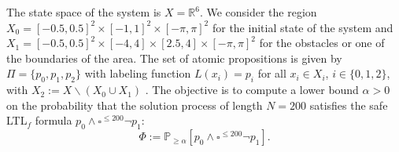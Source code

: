 The state space of the system is $X=\mathbb R^{6}$. We consider the region $X_0 = [-0.5,0.5]^2\times[-1,1]^2\times[-\pi,\pi]^2$ for the initial state of the system and $X_1 = [-0.5,0.5]^2\times[-4,4]\times[2.5,4]\times[-\pi,\pi]^2$ for the obstacles or one of the boundaries of the area. The set of atomic propositions is given by $\Pi=\{p_0,p_1,p_2\}$ with labeling function $L(x_i) = p_i$ for all $x_i\in X_i$, $i\in\{0,1,2\}$, with $X_2 := X\backslash (X_0\cup X_1)$ . The objective is to compute a lower bound $\alpha>0$ on the probability that the solution process of length $N=200$ satisfies the safe LTL$_f$ formula $p_0\wedge\square^{\le 200}\neg p_1$:
$$\Phi:=\mathbb P_{\ge \alpha}[p_0\wedge\square^{\le 200}\neg p_1].$$



